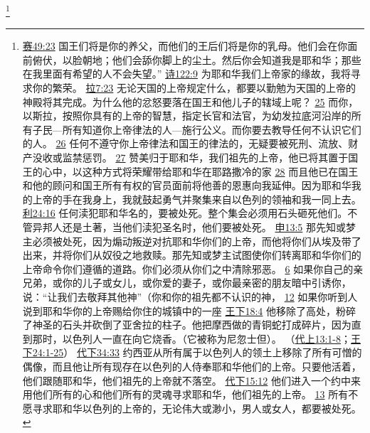 \documentclass[12pt, a4paper, oneside]{ctexart}
\begin{document}
	\footnote {
		\href{https://biblehub.com/isaiah/49-23.htm}{赛49:23} 国王们将是你的养父，而他们的王后们将是你的乳母。他们会在你面前俯伏，以脸朝地；他们会舔你脚上的尘土。然后你会知道我是耶和华；那些在我里面有希望的人不会失望。”
		\href{https://biblehub.com/psalms/122-9.htm}{诗122:9} 为耶和华我们上帝家的缘故，我将寻求你的繁荣。
		\href{https://biblehub.com/ezra/7-23.htm}{拉7:23} 无论天国的上帝规定什么，都要以勤勉为天国的上帝的神殿将其完成。为什么他的忿怒要落在国王和他儿子的辖域上呢？
		\href{https://biblehub.com/ezra/7-25.htm}{25} 而你，以斯拉，按照你具有的上帝的智慧，指定长官和法官，为幼发拉底河沿岸的所有子民---所有知道你上帝律法的人---施行公义。而你要去教导任何不认识它们的人。
		\href{https://biblehub.com/ezra/7-26.htm}{26} 任何不遵守你上帝律法和国王的律法的，无疑要被死刑、流放、财产没收或监禁惩罚。
		\href{https://biblehub.com/ezra/7-27.htm}{27} 赞美归于耶和华，我们祖先的上帝，他已将其置于国王的心中，以这种方式将荣耀带给耶和华在耶路撒冷的家
		\href{https://biblehub.com/ezra/7-28.htm}{28} 而且他已在国王和他的顾问和国王所有有权的官员面前将他善的恩惠向我延伸。因为耶和华我的上帝的手在我身上，我就鼓起勇气并聚集来自以色列的领袖和我一同上去。
		\href{https://biblehub.com/leviticus/24-16.htm}{利24:16} 任何渎犯耶和华名的，要被处死。整个集会必须用石头砸死他们。不管异邦人还是土著，当他们渎犯圣名时，他们要被处死。
		\href{https://biblehub.com/deuteronomy/13-5.htm}{申13:5} 那先知或梦主必须被处死，因为煽动叛逆对抗耶和华你们的上帝，而他将你们从埃及带了出来，并将你们从奴役之地救赎。那先知或梦主试图使你们转离耶和华你们的上帝命令你们遵循的道路。你们必须从你们之中清除邪恶。
		\href{https://biblehub.com/deuteronomy/13-6.htm}{6} 如果你自己的亲兄弟，或你的儿子或女儿，或你爱的妻子，或你最亲密的朋友暗中引诱你，说：“让我们去敬拜其他神”（你和你的祖先都不认识的神，
		\href{https://biblehub.com/deuteronomy/13-12.htm}{12} 如果你听到人说到耶和华你的上帝赐给你住的城镇中的一座
		\href{https://biblehub.com/2_kings/18-4.htm}{王下18:4} 他移除了高处，粉碎了神圣的石头并砍倒了亚舍拉的柱子。他把摩西做的青铜蛇打成碎片，因为直到那时，以色列人一直在向它烧香。（它被称为尼忽士但）。
		（\href{https://biblehub.com/niv/1_chronicles/13.htm}{代上13:1-8}；\href{https://biblehub.com/niv/2_kings/24.htm}{王下24:1-25}） 
		\href{https://biblehub.com/2_chronicles/34-33.htm}{代下34:33} 约西亚从所有属于以色列人的领土上移除了所有可憎的偶像，而且他让所有现存在以色列的人侍奉耶和华他们的上帝。只要他活着，他们跟随耶和华，他们祖先的上帝就不落空。
		\href{https://biblehub.com/2_chronicles/15-12.htm}{代下15:12} 他们进入一个约中来用他们所有的心和他们所有的灵魂寻求耶和华，他们祖先的上帝。
		\href{https://biblehub.com/2_chronicles/15-13.htm}{13} 所有不愿寻求耶和华以色列的上帝的，无论伟大或渺小，男人或女人，都要被处死。
	}
\end{document}

